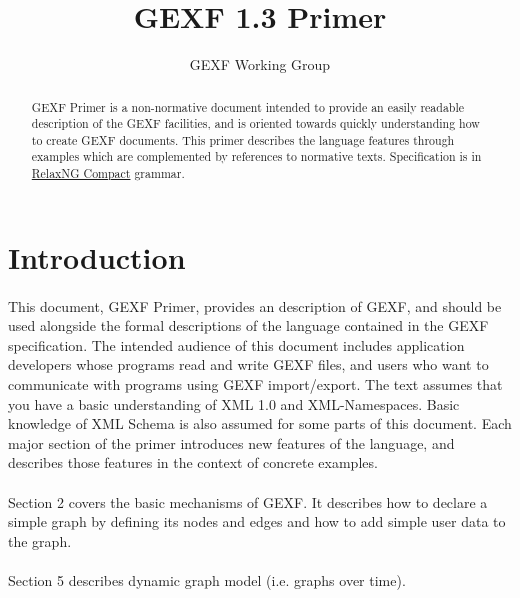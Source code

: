 \documentclass[a4paper,10pt]{article}
\title{GEXF 1.3 Primer}
\author{GEXF Working Group}
\begin{document}
\maketitle

\begin{abstract}
GEXF Primer is a non-normative document intended to provide an easily readable description of the GEXF facilities, and is oriented towards quickly understanding how to create GEXF documents. This primer describes the language features through examples which are complemented by references to normative texts. Specification is in \href{http://relaxng.org/compact-tutorial-20030326.html}{RelaxNG Compact} grammar.
\end{abstract}

\tableofcontents

\section{Introduction} \label{introduction}

\paragraph{}
This document, GEXF Primer, provides an description of GEXF, and should be used alongside the formal descriptions of the language contained in the GEXF specification. The intended audience of this document includes application developers whose programs read and write GEXF files, and users who want to communicate with programs using GEXF import/export. The text assumes that you have a basic understanding of XML 1.0 and  XML-Namespaces. Basic knowledge of XML Schema is also assumed for some parts of this document. Each major section of the primer introduces new features of the language, and describes those features in the context of concrete examples.

\paragraph{}
Section 2 covers the basic mechanisms of GEXF. It describes how to declare a simple graph by defining its nodes and edges and how to add simple user data to the graph.

\paragraph{}
Section 5 describes dynamic graph model (i.e. graphs over time).
\end{document}
